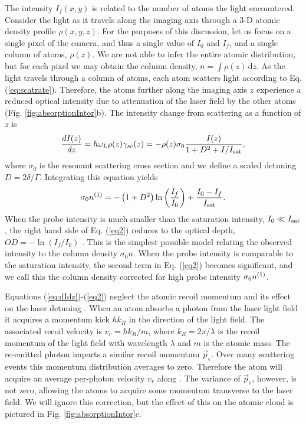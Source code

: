 \documentclass[12pt]{iopart}
\begin{document}
\par The intensity $I_f(x,y)$ is related to the number of atoms the light encountered. Consider the light as it travels along the imaging axis \ez{} through a 3-D atomic density profile $\rho(x,y,z)$. For the purposes of this discussion, let us focus on a single pixel of the camera, and thus a single value of $I_0$ and $I_f$, and a single column of atoms, $\rho(z)$. We are not able to infer the entire atomic distribution, but for each pixel we may obtain the column density, $n = \int \rho\left(z\right) \,\mathrm{d}z$. As the light travels through a column of atoms, each atom scatters light according to Eq. (\ref{eq:scatrate}). Therefore, the atoms further along the imaging axis $z$ experience a reduced optical intensity due to attenuation of the laser field by the other atoms (Fig. \ref{fig:absorptionIntor}b). The intensity change from scattering as a function of $z$ is
\begin{equation}
\frac{dI(z)}{dz}=\hbar\omega_L\rho(z)\gamma_{sc}(z)=-\rho(z)\sigma_0\frac{I(z)}{1+D^2 +I/I_{\rm{sat}}},
\label{eq:dIdz}
\end{equation}
where $\sigma_0$ is the resonant scattering cross section and we define a scaled detuning $D=2\delta/\Gamma$. Integrating this equation yields  \cite{Reinaudi07}
\begin{equation} 
\sigma_0 n^{\rm{(1)}} = -\left(1+D^2\right)\ln\left(\frac{I_f}{I_0}\right) + \frac{I_0-I_f}{I_{\rm{sat}}}.
\label{eq2}
\end{equation}
When the probe intensity is much smaller than the saturation intensity, $I_0\ll I_{\rm{sat}}$, the right hand side of Eq. (\ref{eq2}) reduces to the optical depth, $OD=-\ln \left(I_f/I_0\right)$   \cite{Reinaudi07}. This is the simplest possible model relating the observed intensity to the column density $\sigma_0 n$. When the probe intensity is comparable to the saturation intensity, the second term in Eq. (\ref{eq2}) becomes significant, and we call this the column density corrected for high probe intensity $\sigma_0 n^{\rm{(1)}}$.
\par Equations (\ref{eq:dIdz})-(\ref{eq2}) neglect the atomic recoil momentum and its effect on the laser detuning \cite{Konstantinidis12}. When an atom absorbs a photon from the laser light field it acquires a momentum kick $\hbar k_R$ in the direction of the light field. The associated recoil velocity is $v_r=\hbar k_R/m$, where $k_R=2\pi/\lambda$ is the recoil momentum of the light field with wavelength $\lambda$ and $m$ is the atomic mass. The re-emitted photon imparts a similar recoil momentum $\vec{p}_e$. Over many scattering events this momentum distribution averages to zero. Therefore the atom  will acquire an average per-photon velocity $v_r$ along \ez{}.  The variance of $\vec{p}_e$, however, is not zero, allowing the atoms to acquire some momentum transverse to the laser field. We will ignore this correction, but the effect of this on the atomic cloud is pictured in Fig. \ref{fig:absorptionIntor}c. 
\end{document}
